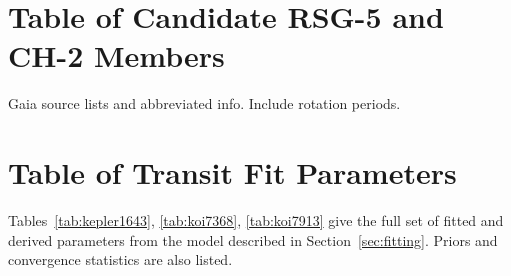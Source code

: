 \documentclass[12pt,twocolumn,linenumbers]{aastex63}
\begin{document}
% 
% 
% 
% 

\clearpage
                            
 

\appendix
\section{Table of Candidate RSG-5 and CH-2 Members}
\label{app:members}

Gaia source lists and abbreviated info.  Include rotation periods.

\section{Table of Transit Fit Parameters}
\label{app:transit}

Tables~\ref{tab:kepler1643}, \ref{tab:koi7368}, \ref{tab:koi7913} give
the full set of fitted and derived parameters from the model described in
Section~\ref{sec:fitting}.
Priors and convergence statistics are also listed.






\end{document}
